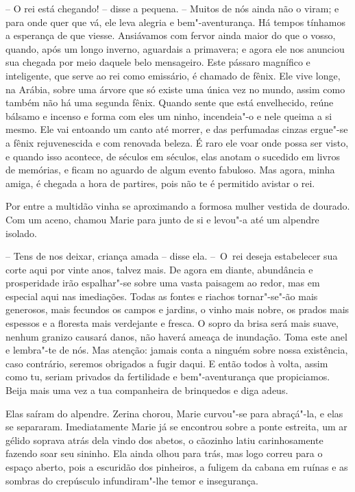 -- O rei está chegando! -- disse a pequena. -- Muitos de nós ainda
não o viram; e para onde quer que vá, ele leva alegria e bem"-aventurança. Há
tempos tínhamos a esperança de que viesse. Ansiávamos com fervor ainda
maior do que o vosso, quando, após um longo inverno, aguardais a primavera;
e agora ele nos anunciou sua chegada por meio daquele belo mensageiro.
Este pássaro magnífico e inteligente, que serve ao rei como emissário,
é chamado de fênix. Ele vive longe, na Arábia, sobre uma árvore que só
existe uma única vez no mundo, assim como também não há uma segunda
fênix. Quando sente que está envelhecido, reúne bálsamo e incenso e
forma com eles um ninho, incendeia"-o e nele queima a si mesmo. Ele vai
entoando um canto até morrer, e das perfumadas cinzas ergue"-se a fênix
rejuvenescida e com renovada beleza. É raro ele voar onde possa
ser visto, e quando isso acontece, de séculos em séculos, elas
anotam o sucedido em livros de memórias, e ficam no aguardo de algum
evento fabuloso. Mas agora, minha amiga, é chegada a hora de partires,
pois não te é permitido avistar o rei.

Por entre a multidão vinha se aproximando a formosa mulher vestida de
dourado. Com um aceno, \mbox{chamou} Marie para junto de si e levou"-a até um
alpendre isolado.

-- Tens de nos deixar, criança amada -- disse ela. \mbox{-- O rei} deseja
estabelecer sua corte aqui por vinte anos, talvez mais. De agora em
diante, abundância e prosperidade irão espalhar"-se sobre uma vasta
paisagem ao redor, mas em especial aqui nas imediações. Todas as fontes
e riachos tornar"-se"-ão mais generosos, mais fecundos os campos e jardins, 
o vinho mais nobre, os prados mais espessos e a floresta mais
verdejante e fresca. O sopro da brisa será mais suave, nenhum granizo
causará danos, não haverá ameaça de inundação. Toma este anel e
lembra"-te de nós. Mas atenção: jamais conta a ninguém sobre nossa
existência, caso contrário, seremos obrigados a fugir daqui. E então
todos à volta, assim como tu, seriam privados da fertilidade e
bem"-aventurança que propiciamos. Beija mais uma vez a tua companheira
de brinquedos e diga adeus.

Elas saíram do alpendre. Zerina chorou, Marie curvou"-se para abraçá"-la,
e elas se separaram. Imediatamente Marie já se encontrou sobre a ponte
estreita, um ar gélido soprava atrás dela vindo dos abetos, o cãozinho
latiu carinhosamente fazendo soar seu sininho. Ela ainda olhou para
trás, mas logo correu para o espaço aberto, pois a escuridão dos
pinheiros, a fuligem da cabana em ruínas e as sombras do crepúsculo
infundiram"-lhe temor e insegurança. 

